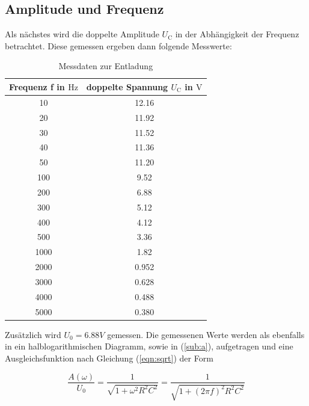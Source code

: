 \subsection{Amplitude und Frequenz}
    Als nächstes wird die doppelte Amplitude $U_\text{C}$ in der Abhängigkeit der Frequenz betrachtet. Diese gemessen ergeben dann folgende Messwerte:
    \begin{table}
        \centering
        \begin{tabular}{c c}
            \toprule
            {Frequenz f in $\si{\hertz}$} & {doppelte Spannung $U_\text{C}$ in $\si{\volt}$} \\
            \midrule
            10   & 12.16 \\
            20   & 11.92 \\
            30   & 11.52 \\
            40   & 11.36 \\
            50   & 11.20 \\
            100  &  9.52 \\
            200  &  6.88 \\
            300  &  5.12 \\
            400  &  4.12 \\
            500  &  3.36 \\
            1000 &  1.82 \\          
            2000 & 0.952 \\
            3000 & 0.628 \\
            4000 & 0.488 \\
            5000 & 0.380 \\
            \bottomrule
        \end{tabular}
    \caption{Messdaten zur Entladung}
    \label{tab:b}
    \end{table}

    \noindent
    Zusätzlich wird $U_0 = 6.88V$ gemessen. Die gemessenen Werte werden als ebenfalls in ein halblogarithmischen Diagramm, sowie in (\ref{sub:a}), aufgetragen und eine Ausgleichsfunktion nach Gleichung (\ref{eqn:sqrt}) der Form
    
    \begin{equation}
        \frac{A(\omega)}{U_0} = \frac{1}{\sqrt{1+\omega^2R^2C^2}} = \frac{1}{\sqrt{1+(2 \pi f)^2R^2C^2}}
    \end{equation}

